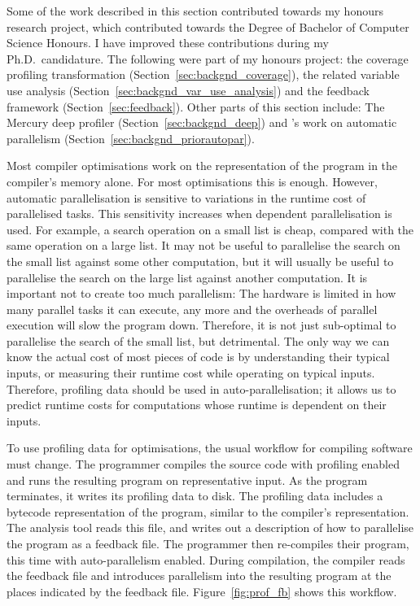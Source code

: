 

Some of the work described in this section contributed towards my honours
research project,
which contributed towards 
the Degree of Bachelor of Computer Science Honours.
I have improved these contributions during my Ph.D.\
candidature.
The following were part of my honours project:
the coverage profiling transformation (Section~\ref{sec:backgnd_coverage}),
the related variable use analysis (Section~\ref{sec:backgnd_var_use_analysis})
and the feedback framework (Section~\ref{sec:feedback}).
Other parts of this section include:
The Mercury deep profiler \citep{conway:2001:mercury-deep}
(Section~\ref{sec:backgnd_deep}) and
\citet*{tannier:2007:parallel_mercury}'s work on automatic parallelism
(Section~\ref{sec:backgnd_priorautopar}).

Most compiler optimisations work on the representation of the program in
the compiler's memory alone.
For most optimisations this is enough.
However,
automatic parallelisation is sensitive to variations in the runtime cost of
parallelised tasks.
This sensitivity increases when dependent parallelisation is used.
For example,
a search operation on a small list is cheap, compared with the same operation on
a large list.
It may not be useful to parallelise the search on the small list against some
other computation,
but it will usually be useful to parallelise the search on the large list
against another computation.
It is important not to create too much parallelism:
The hardware is limited in how many parallel tasks it can execute,
any more and the overheads of parallel execution will slow the program down.
Therefore, it is not just sub-optimal to parallelise the search of the small list,
but detrimental.
The only way we can know the actual cost of most pieces of code
is by understanding their typical inputs,
or measuring their runtime cost while operating on typical inputs.
Therefore,
profiling data should be used in auto-parallelisation;
it allows us to predict runtime costs for computations whose
runtime is dependent on their inputs.

To use profiling data for optimisations,
the usual workflow for compiling software must change.
The programmer compiles the source code with profiling enabled and runs the
resulting program on representative input.
As the program terminates,
it writes its profiling data to disk.
The profiling data includes a bytecode representation of the program,
similar to the compiler's representation.
The analysis tool reads this file,
and writes out a description of how to parallelise the program as a feedback
file.
The programmer then re-compiles their program,
this time with auto-parallelism enabled.
During compilation,
the compiler reads the feedback file and introduces parallelism into the
resulting program at the places indicated by the feedback file.
Figure~\ref{fig:prof_fb} shows this workflow.

